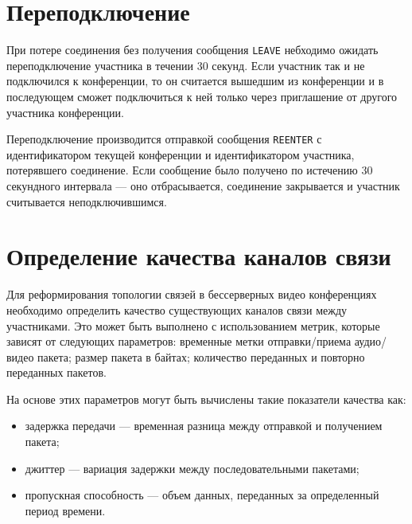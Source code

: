 
\section{Переподключение}

При потере соединения без получения сообщения \texttt{LEAVE} небходимо ожидать переподключение участника в течении 30 секунд. Если участник так и не подключился к конференции, то он считается вышедшим из конференции и в последующем сможет подключиться к ней только через приглашение от другого участника конференции.

Переподключение производится отправкой сообщения \texttt{REENTER} с идентификатором текущей конференции и идентификатором участника, потерявшего соединение. Если сообщение было получено по истечению 30 секундного интервала --- оно отбрасывается, соединение закрывается и участник считывается неподключившимся.

\section{Определение качества каналов связи}

Для реформирования топологии связей в бессерверных видео конференциях необходимо определить качество существующих каналов связи между участниками. Это может быть выполнено с использованием метрик, которые зависят от следующих параметров: временные метки отправки/приема аудио/видео пакета; размер пакета в байтах; количество переданных и повторно переданных пакетов.

На основе этих параметров могут быть вычислены такие показатели качества как:
\begin{itemize}[label=---]
  \item задержка передачи --- временная разница между отправкой и получением пакета;
  \item джиттер --- вариация задержки между последовательными пакетами;
  \item пропускная способность --- объем данных, переданных за определенный период времени.
\end{itemize}
